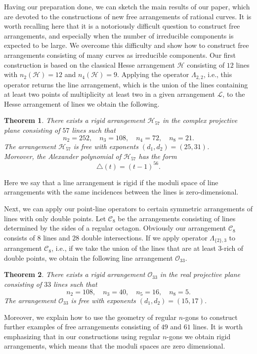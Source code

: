 \documentclass[11pt]{article}
\theoremstyle{plain}
\theoremstyle{definition}
\theoremstyle{plain}
\newtheorem{custom}{{\rm Theorem}}
\begin{document}
Having our preparation done, we can sketch the main results of our paper, which are devoted to the constructions of new free arrangements of rational curves. It is worth recalling here that it is a notoriously difficult question to construct free arrangements, and especially when the number of irreducible components is expected to be large. We overcome this difficulty and show how to construct free arrangements consisting of many curves as irreducible components. Our first construction is based on the classical Hesse arrangement $\mathcal{H}$ consisting of $12$ lines with $n_{2}(\mathcal{H}) = 12$ and $n_{4}(\mathcal{H})=9$. Applying the operator $\Lambda_{2,2}$, i.e., this operator returns the line arrangement, which is the union of the lines containing at least two points of multiplicity at least two in a given arrangement $\mathcal{L}$, to the Hesse arrangement of lines we obtain the following. 
\begin{custom}
There exists a rigid arrangement $\mathcal{H}_{57}$ in the complex projective plane consisting of $57$ lines such that
$$n_{2} = 252, \quad n_{3} = 108, \quad n_{4} = 72, \quad n_{8}=21.$$
The arrangement $\mathcal{H}_{57}$ is free with exponents $(d_{1},d_{2}) = (25,31)$.\\
Moreover, the Alexander polynomial of $\mathcal{H}_{57}$
has the form
$$\triangle(t) = (t-1)^{56}.$$
\end{custom}
Here we say that a line arrangement is rigid if the moduli space of line arrangements with the same incidences between the lines is zero-dimensional. 

Next, we can apply our point-line operators to certain symmetric arrangements of lines with only double points. Let $\mathcal{C}_{8}$ be the arrangements consisting of lines determined by the sides of a regular octagon. Obviously our arrangement $\mathcal{C}_{8}$ consists of $8$ lines and $28$ double intersections. If we apply operator $\Lambda_{\{2\},3}$ to arrangement $\mathcal{C}_{8}$, i.e., if we take the union of the lines that are at least $3$-rich of double points, we obtain the following line arrangement $\mathcal{O}_{33}$.
\begin{custom}
There exists a rigid arrangement $\mathcal{O}_{33}$ in the real projective plane consisting of $33$ lines such that
$$n_{2} = 108, \quad n_{3} = 40, \quad n_{5} = 16, \quad n_{8}=5.$$
The arrangement $\mathcal{O}_{33}$ is free with exponents $(d_{1},d_{2}) = (15,17)$. 
\end{custom}
Moreover, we explain how to use the geometry of regular $n$-gons to construct further examples of free arrangements consisting of $49$ and $61$ lines. It is worth emphasizing that in our constructions using regular $n$-gons we obtain rigid arrangements, which means that the moduli spaces are zero dimensional. %
\end{document}
